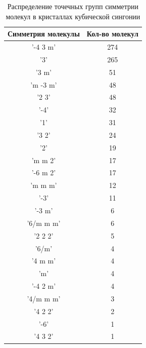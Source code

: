 \documentclass[12pt,a4paper, russian]{extarticle}
\begin{document}
\begin{table}[H]
\centering
\begin{tabular}{c|c}
Симметрия молекулы & Кол-во молекул \\
\hline
 '-4 3 m' & 274 \\
 '3' & 265 \\
 '3 m' & 51 \\
 'm -3 m' & 48 \\
 '2 3' & 48 \\
 '-4' & 32 \\
 '1' & 31 \\
 '3 2' & 24 \\
 '2' & 19 \\
 'm m 2' & 17 \\
 '-6 m 2' & 17 \\
 'm m m' & 12 \\
 '-3' & 11 \\
 '-3 m' & 6 \\
 '6/m m m' & 6 \\
 '2 2 2' & 5 \\
 '6/m' & 4 \\
 '4 m m' & 4 \\
 'm' & 4 \\
 '-4 2 m' & 4 \\
 '4/m m m' & 3 \\
 '4 2 2' & 2 \\
 '-6' & 1 \\
 '4 3 2' & 1 
\end{tabular}
\caption{Распределение точечных групп симметрии молекул в кристаллах кубической сингонии}
\end{table}
\end{document}

